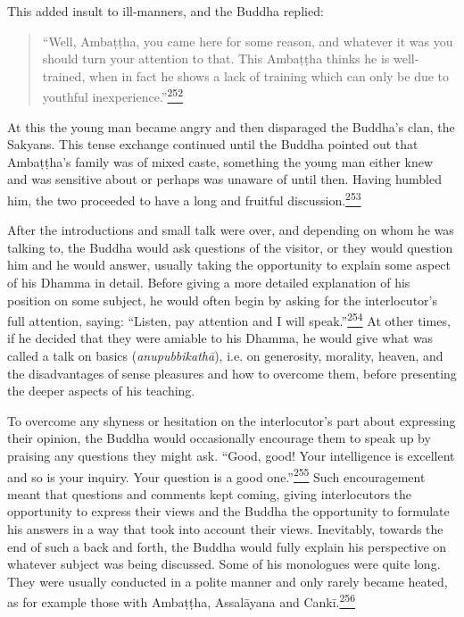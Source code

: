 This added insult to ill-manners, and the Buddha replied:

\begin{quote}
``Well, Ambaṭṭha, you came here for some reason, and whatever it was you
should turn your attention to that. This Ambaṭṭha thinks he is
well-trained, when in fact he shows a lack of training which can only be
due to youthful
inexperience.''\label{footprints_split_010.html_fnref252}\hyperref[footprints_split_024.htmlux5cux23fn252]{\textsuperscript{252}}
\end{quote}

At this the young man became angry and then disparaged the Buddha's
clan, the Sakyans. This tense exchange continued until the Buddha
pointed out that Ambaṭṭha's family was of mixed caste, something the
young man either knew and was sensitive about or perhaps was unaware of
until then. Having humbled him, the two proceeded to have a long and
fruitful
discussion.\label{footprints_split_010.html_fnref253}\hyperref[footprints_split_024.htmlux5cux23fn253]{\textsuperscript{253}}

After the introductions and small talk were over, and depending on whom
he was talking to, the Buddha would ask questions of the visitor, or
they would question him and he would answer, usually taking the
opportunity to explain some aspect of his Dhamma in detail. Before
giving a more detailed explanation of his position on some subject, he
would often begin by asking for the interlocutor's full attention,
saying: ``Listen, pay attention and I will
speak.''\label{footprints_split_010.html_fnref254}\hyperref[footprints_split_024.htmlux5cux23fn254]{\textsuperscript{254}}
At other times, if he decided that they were amiable to his Dhamma, he
would give what was called a talk on basics (\emph{anupubbikathā}), i.e.
on generosity, morality, heaven, and the disadvantages of sense
pleasures and how to overcome them, before presenting the deeper aspects
of his teaching.

To overcome any shyness or hesitation on the interlocutor's part about
expressing their opinion, the Buddha would occasionally encourage them
to speak up by praising any questions they might ask. ``Good, good! Your
intelligence is excellent and so is your inquiry. Your question is a
good
one.''\label{footprints_split_010.html_fnref255}\hyperref[footprints_split_024.htmlux5cux23fn255]{\textsuperscript{255}}
Such encouragement meant that questions and comments kept coming, giving
interlocutors the opportunity to express their views and the Buddha the
opportunity to formulate his answers in a way that took into account
their views. Inevitably, towards the end of such a back and forth, the
Buddha would fully explain his perspective on whatever subject was being
discussed. Some of his monologues were quite long. They were usually
conducted in a polite manner and only rarely became heated, as for
example those with Ambaṭṭha, Assalāyana and
Cankī.\label{footprints_split_010.html_fnref256}\hyperref[footprints_split_024.htmlux5cux23fn256]{\textsuperscript{256}}

